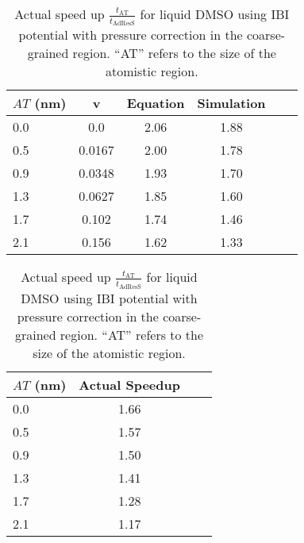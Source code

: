 \documentclass[a4paper,preprint,unsortedaddress]{revtex4-1}
\begin{document}
\begin{table}[htb]
\centering
\begin{minipage}{0.48\textwidth}
\sffamily
\begin{tabular}{l*{5}{c}}
\hline \hline
 \bfseries $AT$ (nm) & \bfseries v & \bfseries Equation & \bfseries Simulation \\
\midrule
\hline \hline
0.0 & 0.0 &  2.06 & 1.88 \\
0.5 & 0.0167 & 2.00 & 1.78\\
0.9 & 0.0348 & 1.93 & 1.70\\
1.3 & 0.0627 & 1.85 & 1.60\\
1.7 & 0.102 & 1.74 & 1.46\\
2.1 & 0.156 & 1.62 & 1.33\\ \bottomrule
\hline \hline
\end{tabular}
\caption{Comparison of speed up for liquid DMSO using IBI potential with pressure correction in the coarse-grained region, calculated using Eq. 9 and from AdResS simulation.}
\label{dmso}
\end{minipage}%
\hfill
\begin{minipage}{0.48\textwidth}
\centering
\sffamily
\begin{tabular}{l*{3}{c}}
\toprule
\hline \hline
 \bfseries $AT$ (nm) & \bfseries Actual Speedup \\
\midrule
\hline \hline
0.0 & 1.66\\
0.5 & 1.57  \\
0.9 & 1.50\\
1.3 & 1.41 \\
1.7 & 1.28\\
2.1 & 1.17\\ \bottomrule
\hline \hline
\end{tabular}
\caption{{Actual speed up $\frac{t_\text{AT}}{t_\text{AdResS}}$ for liquid DMSO using IBI potential with pressure correction in the coarse-grained region. ``AT'' refers to the size of the atomistic region.}}
\label{dmso1}
\end{minipage}
\end{table}
\end{document}
